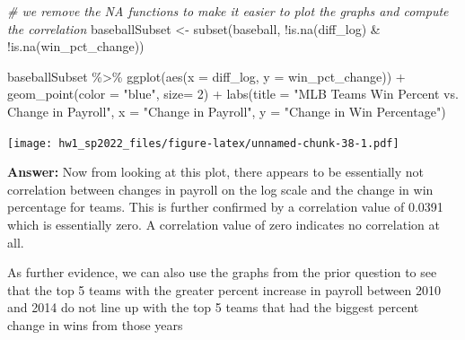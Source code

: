\documentclass[
]{article}
\newenvironment{Shaded}{\begin{snugshade}}{\end{snugshade}}
\newcommand{\AttributeTok}[1]{\textcolor[rgb]{0.77,0.63,0.00}{#1}}
\newcommand{\CommentTok}[1]{\textcolor[rgb]{0.56,0.35,0.01}{\textit{#1}}}
\newcommand{\DecValTok}[1]{\textcolor[rgb]{0.00,0.00,0.81}{#1}}
\newcommand{\FunctionTok}[1]{\textcolor[rgb]{0.00,0.00,0.00}{#1}}
\newcommand{\NormalTok}[1]{#1}
\newcommand{\OtherTok}[1]{\textcolor[rgb]{0.56,0.35,0.01}{#1}}
\newcommand{\SpecialCharTok}[1]{\textcolor[rgb]{0.00,0.00,0.00}{#1}}
\newcommand{\StringTok}[1]{\textcolor[rgb]{0.31,0.60,0.02}{#1}}
\begin{document}
\begin{Shaded}
\begin{Highlighting}[]
\CommentTok{\# we remove the NA functions to make it easier to plot the graphs and compute the correlation}
\NormalTok{baseballSubset }\OtherTok{\textless{}{-}} \FunctionTok{subset}\NormalTok{(baseball, }\SpecialCharTok{!}\FunctionTok{is.na}\NormalTok{(diff\_log) }\SpecialCharTok{\&} \SpecialCharTok{!}\FunctionTok{is.na}\NormalTok{(win\_pct\_change))}

\NormalTok{baseballSubset }\SpecialCharTok{\%\textgreater{}\%}
  \FunctionTok{ggplot}\NormalTok{(}\FunctionTok{aes}\NormalTok{(}\AttributeTok{x =}\NormalTok{ diff\_log, }\AttributeTok{y =}\NormalTok{ win\_pct\_change)) }\SpecialCharTok{+} 
  \FunctionTok{geom\_point}\NormalTok{(}\AttributeTok{color =} \StringTok{"blue"}\NormalTok{, }\AttributeTok{size=} \DecValTok{2}\NormalTok{) }\SpecialCharTok{+} 
  \FunctionTok{labs}\NormalTok{(}\AttributeTok{title =} \StringTok{"MLB Team\textquotesingle{}s Win Percent  vs. Change in Payroll"}\NormalTok{, }
       \AttributeTok{x =} \StringTok{"Change in Payroll"}\NormalTok{, }
       \AttributeTok{y =} \StringTok{"Change in Win Percentage"}\NormalTok{)}
\end{Highlighting}
\end{Shaded}

\texttt{[image: hw1\_sp2022\_files/figure-latex/unnamed-chunk-38-1.pdf]}

\begin{Shaded}
\end{Shaded}

\textbf{Answer:} Now from looking at this plot, there appears to be
essentially not correlation between changes in payroll on the log scale
and the change in win percentage for teams. This is further confirmed by
a correlation value of 0.0391 which is essentially zero. A correlation
value of zero indicates no correlation at all.

As further evidence, we can also use the graphs from the prior question
to see that the top 5 teams with the greater percent increase in payroll
between 2010 and 2014 do not line up with the top 5 teams that had the
biggest percent change in wins from those years
\end{document}
